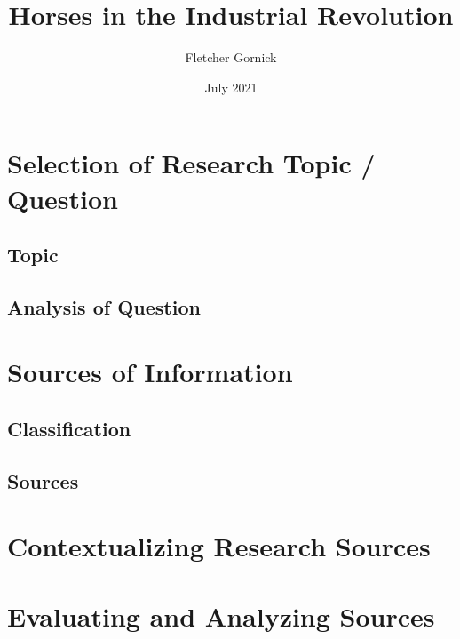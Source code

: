\documentclass[12pt]{article}
\title{Horses in the Industrial Revolution}
\author{Fletcher Gornick}
\date{July 2021}
\begin{document}
\onehalfspacing


\tableofcontents
\newpage

\section{Selection of Research Topic / Question}
\subsection{Topic}

\subsection{Analysis of Question}

\newpage

\section{Sources of Information}


\subsection{Classification}

\newpage

\subsection{Sources}
 \newpage

 \newpage
 \newpage
 \newpage
 \newpage

\section{Contextualizing Research Sources}

 \newpage
 \newpage
 \newpage
 \newpage
 \newpage
 \newpage

\section{Evaluating and Analyzing Sources}


 \newpage
 \newpage
 \newpage
 \newpage
 \newpage
 \newpage
\end{document}
